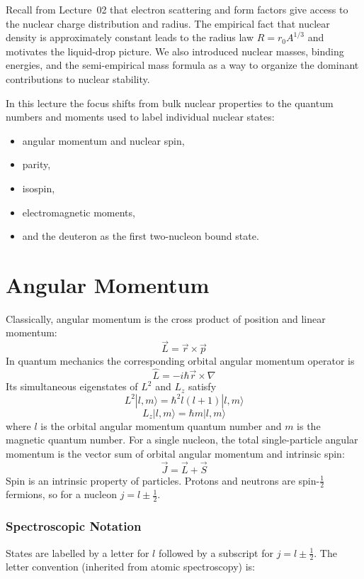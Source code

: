 Recall from Lecture~02 that electron scattering and form factors give access to the nuclear charge distribution and radius.  The empirical fact that nuclear density is approximately constant leads to the radius law $R=r_0A^{1/3}$ and motivates the liquid-drop picture.  We also introduced nuclear masses, binding energies, and the semi-empirical mass formula as a way to organize the dominant contributions to nuclear stability.

In this lecture the focus shifts from bulk nuclear properties to the quantum numbers and moments used to label individual nuclear states:
\begin{itemize}
    \item angular momentum and nuclear spin,
    \item parity,
    \item isospin,
    \item electromagnetic moments,
    \item and the deuteron as the first two-nucleon bound state.
\end{itemize}


\section*{Angular Momentum}
Classically, angular momentum is the cross product of position and linear momentum:
\[\vec{L} = \vec{r} \times \vec{p} \]
In quantum mechanics the corresponding orbital angular momentum operator is
\[\hat{L} = -i\hbar \vec{r} \times \nabla \]
Its simultaneous eigenstates of $L^2$ and $L_z$ satisfy
\[L^2 |l, m\rangle = \hbar^2 l(l+1) |l, m\rangle \]
\[L_z |l, m\rangle = \hbar m |l, m\rangle \]
where \(l\) is the orbital angular momentum quantum number and \(m\) is the magnetic quantum number.  For a single nucleon, the total single-particle angular momentum is the vector sum of orbital angular momentum and intrinsic spin:
\[\vec{J} = \vec{L} + \vec{S} \]
Spin is an intrinsic property of particles.  Protons and neutrons are spin-$\tfrac{1}{2}$ fermions, so for a nucleon $j=l\pm\tfrac{1}{2}$.

\subsubsection*{Spectroscopic Notation}
States are labelled by a letter for $l$ followed by a subscript for $j = l \pm \tfrac{1}{2}$.
The letter convention (inherited from atomic spectroscopy) is:

